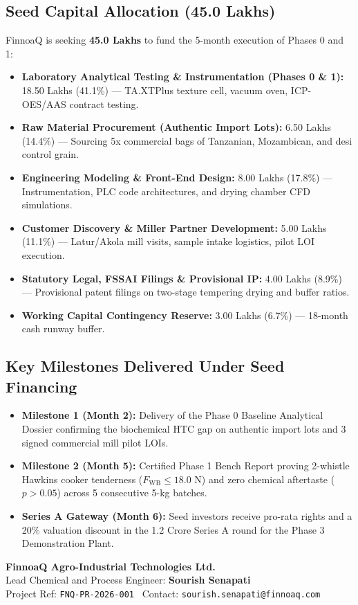\documentclass[10pt,a4paper]{article}
\newcommand{\inr}{\text{INR~}}
\begin{document}
\subsection{Seed Capital Allocation (\inr 45.0 Lakhs)}
FinnoaQ is seeking \textbf{\inr 45.0 Lakhs} to fund the 5-month execution of Phases 0 and 1:
\begin{itemize}[leftmargin=*]
    \item \textbf{Laboratory Analytical Testing \& Instrumentation (Phases 0 \& 1):} \inr 18.50 Lakhs (41.1\%) --- TA.XTPlus texture cell, vacuum oven, ICP-OES/AAS contract testing.
    \item \textbf{Raw Material Procurement (Authentic Import Lots):} \inr 6.50 Lakhs (14.4\%) --- Sourcing 5x commercial bags of Tanzanian, Mozambican, and desi control grain.
    \item \textbf{Engineering Modeling \& Front-End Design:} \inr 8.00 Lakhs (17.8\%) --- Instrumentation, PLC code architectures, and drying chamber CFD simulations.
    \item \textbf{Customer Discovery \& Miller Partner Development:} \inr 5.00 Lakhs (11.1\%) --- Latur/Akola mill visits, sample intake logistics, pilot LOI execution.
    \item \textbf{Statutory Legal, FSSAI Filings \& Provisional IP:} \inr 4.00 Lakhs (8.9\%) --- Provisional patent filings on two-stage tempering drying and buffer ratios.
    \item \textbf{Working Capital Contingency Reserve:} \inr 3.00 Lakhs (6.7\%) --- 18-month cash runway buffer.
\end{itemize}

\subsection{Key Milestones Delivered Under Seed Financing}
\begin{itemize}[leftmargin=*]
    \item \textbf{Milestone 1 (Month 2):} Delivery of the Phase 0 Baseline Analytical Dossier confirming the biochemical HTC gap on authentic import lots and 3 signed commercial mill pilot LOIs.
    \item \textbf{Milestone 2 (Month 5):} Certified Phase 1 Bench Report proving 2-whistle Hawkins cooker tenderness ($F_{\mathrm{WB}} \le 18.0\text{ N}$) and zero chemical aftertaste ($p > 0.05$) across 5 consecutive 5-kg batches.
    \item \textbf{Series A Gateway (Month 6):} Seed investors receive pro-rata rights and a 20\% valuation discount in the \inr 1.2 Crore Series A round for the Phase 3 Demonstration Plant.
\end{itemize}

\bigskip
\begin{center}
\textbf{FinnoaQ Agro-Industrial Technologies Ltd.}\\
Lead Chemical and Process Engineer: \textbf{Sourish Senapati}\\
Project Ref: \texttt{FNQ-PR-2026-001} \textbar\ Contact: \texttt{sourish.senapati@finnoaq.com}
\end{center}
\end{document}
